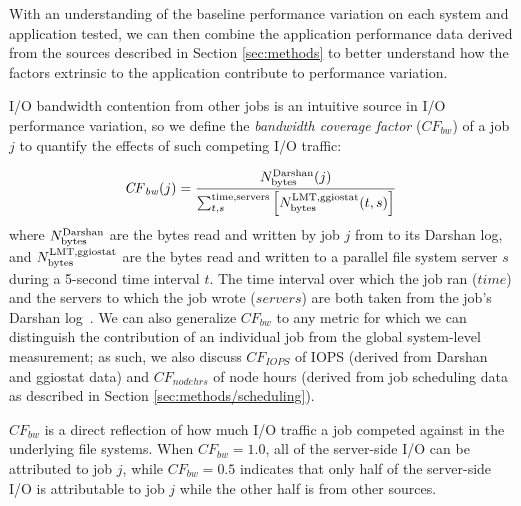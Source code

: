 With an understanding of the baseline performance variation on each system and application tested, we can then combine the application performance data derived from the sources described in Section \ref{sec:methods} to better understand how the factors extrinsic to the application contribute to performance variation.

I/O bandwidth contention from other jobs is an intuitive source in I/O performance variation, so we define the \emph{bandwidth coverage factor} ($\mathit{CF}_{\mathit{bw}}$) of a job $j$ to quantify the effects of such competing I/O traffic:

\begin{equation} \label{eq:cf}
    \mathit{CF}_{\mathit{bw}}(j) = \frac{N_{\textup{bytes}}^{\textup{Darshan}}(j)}
    {\sum_{t,s}^{\textup{time,servers}}
    \left [ N_{\textup{bytes}}^{\textup{LMT,ggiostat}}(t,s) \right ] }
\end{equation}
%
where 
$N_{\textup{bytes}}^{\textup{Darshan}}$ are the bytes read and written by job $j$ from to its Darshan log, and 
$N_{\textup{bytes}}^{\textup{LMT,ggiostat}}$ are the bytes read and written to a parallel file system server $s$ during a 5-second time interval $t$.
The time interval over which the job ran ($\mathit{time}$) and the servers to which the job wrote ($\mathit{servers}$) are both taken from the job's Darshan log~\cite{snyder2016modular}.
We can also generalize $\mathit{CF}_{\mathit{bw}}$ to any metric for which we can distinguish the contribution of an individual job from the global system-level measurement; as such, we also discuss $\mathit{CF}_{\mathit{IOPS}}$ of IOPS (derived from Darshan and ggiostat data) and $\mathit{CF}_{\mathit{nodehrs}}$ of node hours (derived from job scheduling data as described in Section \ref{sec:methods/scheduling}).

$\mathit{CF}_{\mathit{bw}}$ is a direct reflection of how much I/O traffic a job competed against in the underlying file systems.
When $\mathit{CF}_{\mathit{bw}} = 1.0$, all of the server-side I/O can be attributed to job $j$, while $\mathit{CF}_{\mathit{bw}} = 0.5$ indicates that only half of the server-side I/O is attributable to job $j$ while the other half is from other sources.

